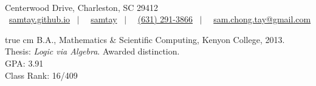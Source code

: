 \documentclass[11pt,article,oneside]{memoir}
\makeatletter
\def\myemail{sam.chong.tay@gmail.com}
\def\myweb{https://samtay.github.io}
\def\myphone{(631) 291-3866}
\def\mygithub{samtay}
\makeatother
\begin{document}
\renewcommand{\labelitemi}{~}

\def\ind{\hangindent=1 true cm\hangafter=1 \noindent}
\def\labelitemi{~}
\renewcommand{\labelitemii}{~}


\pagestyle{kjh}


\begin{center}
 \\
\vspace{.6em}

\footnotesize
   Centerwood Drive, Charleston, \textsc{SC} 29412 \\
  \vspace{.3em}
  \faGlobe \, \href{\myweb}{samtay.github.io}
  $\enspace | \enspace$
  \faGithub \, \href{https://github.com/samtay}{\mygithub}
  $\enspace | \enspace$
  \faPhone \, \href{tel:\myphone}{\myphone}
  $\enspace | \enspace$
  \faEnvelope \, \href{mailto:\myemail}{\myemail}
\normalsize
\end{center}

\bigskip

\reversemarginpar


\ind B.A., Mathematics \& Scientific Computing, Kenyon College, 2013. \\
\footnotesize
  Thesis: \emph{Logic via Algebra}. Awarded distinction. \\
  GPA: 3.91 \\
  Class Rank: 16/409
\normalsize
\vspace{0.05in}

\bigskip


\end{document}
